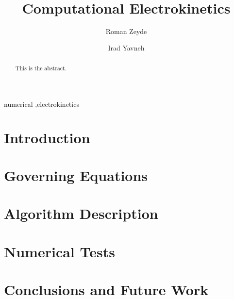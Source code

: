 \documentclass[final]{elsarticle}
\begin{document}
\begin{frontmatter}

\title{Computational Electrokinetics}
\author[tech]{Roman Zeyde}
\author[tech]{Irad Yavneh}

\address[tech]{Technion, Israel}

\begin{abstract}
This is the abstract.
\end{abstract}

\begin{keyword}
numerical \sep electrokinetics 
\end{keyword}

\end{frontmatter}

\section{Introduction} \label{intro}
\section{Governing Equations} \label{equations}
\section{Algorithm Description} \label{algorithm}
\section{Numerical Tests} \label{results}
\section{Conclusions and Future Work} \label{conclusions}



\end{document}
